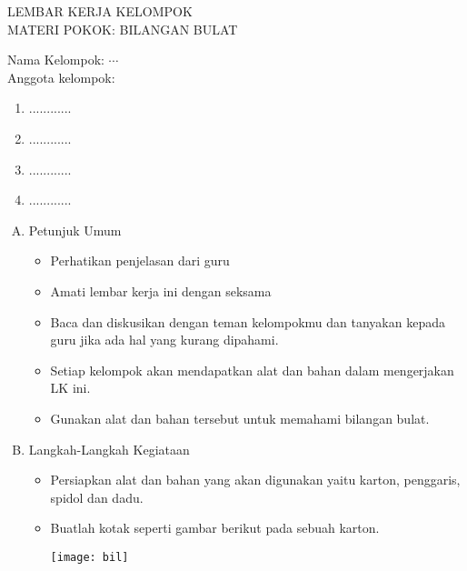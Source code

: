 \documentclass[a5paper,10pt,openany]{book}
\begin{document}
{\color{NavyBlue}
	\begin{center}
{	\large	LEMBAR KERJA KELOMPOK\\[6pt]
	
		MATERI POKOK: BILANGAN BULAT}
	\end{center}
Nama Kelompok: $\cdots$\\
Anggota kelompok:
\begin{enumerate}[1.]
	\item ............\\[-12pt]
	\item ............\\[-12pt]
	\item ............\\[-12pt]
	\item ............\\[-12pt]
\end{enumerate}
\begin{enumerate}[A.,leftmargin=*,itemsep=-4pt,topsep=2pt]
	\item Petunjuk Umum\\[-12pt]
	\begin{itemize}[\faCheckSquare,leftmargin=*,itemsep=4pt,topsep=2pt]
	\item Perhatikan penjelasan dari guru
	\item Amati lembar kerja ini dengan seksama
	\item Baca dan diskusikan dengan teman kelompokmu dan tanyakan kepada guru jika ada hal yang kurang dipahami.
	\item Setiap kelompok akan mendapatkan alat dan bahan dalam mengerjakan LK ini.
	\item Gunakan alat dan bahan tersebut untuk memahami bilangan bulat.
\end{itemize}
	\item Langkah-Langkah Kegiataan\\[-12pt]
	\begin{itemize}[\faCheckSquare,leftmargin=*,itemsep=4pt,topsep=2pt]
		\item Persiapkan alat dan bahan yang akan digunakan yaitu karton, penggaris, spidol dan dadu.
		\item Buatlah kotak seperti gambar berikut pada sebuah karton.
		\begin{center}
		\texttt{[image: bil]}	
		\end{center}

\end{itemize}
\end{enumerate}}
\end{document}
